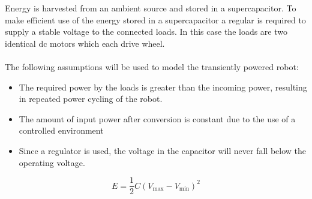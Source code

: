Energy is harvested from an ambient source and stored in a supercapacitor.
To make efficient use of the energy stored in a supercapacitor a regular is required to supply a stable voltage to the connected loads.
In this case the loads are two identical dc motors which each drive wheel. \\
\\ \noindent
The following assumptions will be used to model the transiently powered robot:
\begin{itemize}
	\item The required power by the loads is greater than the incoming power, resulting in repeated power cycling of the robot.
	\item The amount of input power after conversion is constant due to the use of a controlled environment
	\item Since a regulator is used, the voltage in the capacitor will never fall below the operating voltage.
\end{itemize}




\begin{equation}
\label{eq:cap2}
E = \frac{1}{2}C(V_{\max} - V_{\min})^{2}
\end{equation}












